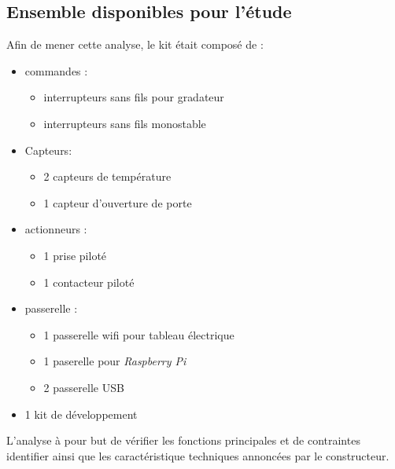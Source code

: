 \documentclass{rapportENS}
\begin{document}
\subsection{Ensemble disponibles pour l'étude}
Afin de mener cette analyse, le kit était composé de :
\begin{itemize}
\item commandes : 
\begin{itemize}
    \item interrupteurs sans fils pour gradateur
    \item interrupteurs sans fils monostable
\end{itemize}
\item Capteurs:
\begin{itemize}
    \item 2 capteurs de température
    \item 1 capteur d'ouverture de porte
\end{itemize}
\item actionneurs :
\begin{itemize}
    \item 1 prise piloté
    \item 1 contacteur piloté
\end{itemize}
\item passerelle : 
\begin{itemize}
    \item 1 passerelle wifi pour tableau électrique
    \item 1 paserelle pour \textit{Raspberry Pi}
    \item 2 passerelle USB
\end{itemize}
\item 1 kit de développement  
\end{itemize}  
L'analyse à pour but de vérifier les fonctions principales et de contraintes identifier ainsi que les caractéristique techniques annoncées par le constructeur. 
 
\end{document}
